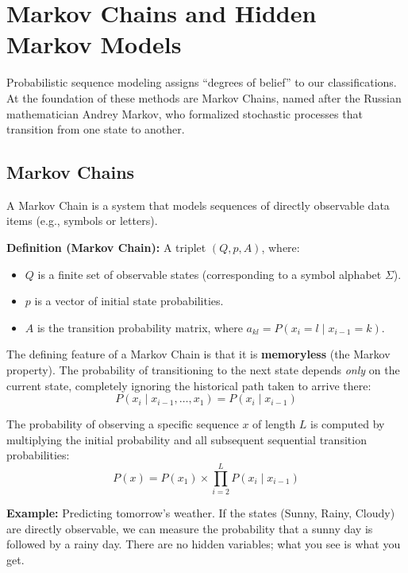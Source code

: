 \section{Markov Chains and Hidden Markov Models}

Probabilistic sequence modeling assigns ``degrees of belief'' to our classifications. At the foundation of these methods are Markov Chains, named after the Russian mathematician Andrey Markov, who formalized stochastic processes that transition from one state to another.

\subsection{Markov Chains}

A Markov Chain is a system that models sequences of directly observable data items (e.g., symbols or letters).

\begin{important}
  \textbf{Definition (Markov Chain):} A triplet \( (Q, p, A) \), where:
  \begin{itemize}
      \item \( Q \) is a finite set of observable states (corresponding to a symbol alphabet \( \Sigma \)).
      \item \( p \) is a vector of initial state probabilities.
      \item \( A \) is the transition probability matrix, where \( a_{kl} = P(x_i = l \mid x_{i-1} = k) \).
  \end{itemize}
\end{important}

\sta The defining feature of a Markov Chain is that it is \textbf{memoryless} (the Markov property). The probability of transitioning to the next state depends \textit{only} on the current state, completely ignoring the historical path taken to arrive there:
\begin{equation}
P(x_i \mid x_{i-1}, \dots, x_1) = P(x_i \mid x_{i-1})
\end{equation}

The probability of observing a specific sequence \( x \) of length \( L \) is computed by multiplying the initial probability and all subsequent sequential transition probabilities:
\begin{equation}
P(x) = P(x_1) \times \prod_{i=2}^{L} P(x_i \mid x_{i-1})
\end{equation}

\textbf{Example:} Predicting tomorrow's weather.
If the states (Sunny, Rainy, Cloudy) are directly observable, we can measure the probability that a sunny day is followed by a rainy day. There are no hidden variables; what you see is what you get.

